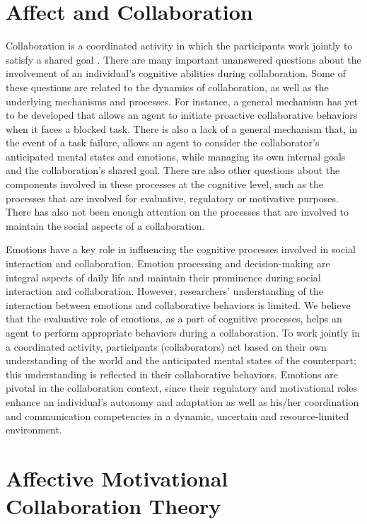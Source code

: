 \documentclass[letterpaper]{article}
\begin{document}
\section{Affect and Collaboration}

Collaboration is a coordinated activity in which the participants work jointly
to satisfy a shared goal \cite{grosz:plans-discourse}. There are many important
unanswered questions about the involvement of an individual's cognitive
abilities during collaboration. Some of these questions are related to the
dynamics of collaboration, as well as the underlying mechanisms and processes.
For instance, a general mechanism has yet to be developed that allows an agent
to initiate proactive collaborative behaviors when it faces a blocked task.
There is also a lack of a general mechanism that, in the event of a task
failure, allows an agent to consider the collaborator's anticipated mental
states and emotions, while managing its own internal goals and the
collaboration's shared goal. There are also other questions about the components
involved in these processes at the cognitive level, such as the processes that
are involved for evaluative, regulatory or motivative purposes. There has also
not been enough attention on the processes that are involved to maintain the
social aspects of a collaboration.

Emotions have a key role in influencing the cognitive processes involved in
social interaction and collaboration. Emotion processing and decision-making are
integral aspects of daily life and maintain their prominence during social
interaction and collaboration. However, researchers' understanding of the
interaction between emotions and collaborative behaviors is limited. We believe
that the evaluative role of emotions, as a part of cognitive processes, helps an
agent to perform appropriate behaviors during a collaboration. To work jointly
in a coordinated activity, participants (collaborators) act based on their own
understanding of the world and the anticipated mental states of the counterpart;
this understanding is reflected in their collaborative behaviors. Emotions are
pivotal in the collaboration context, since their regulatory and motivational
roles enhance an individual's autonomy and adaptation as well as his/her
coordination and communication competencies in a dynamic, uncertain and
resource-limited environment.

\section{Affective Motivational Collaboration Theory}
\end{document}
